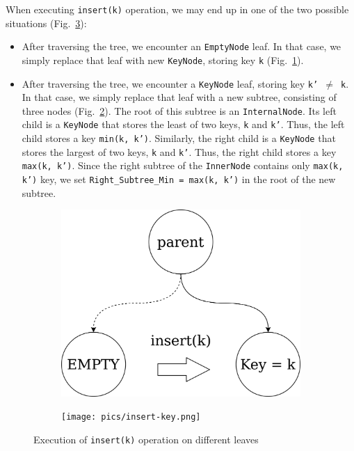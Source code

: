 \documentclass[times, dvipsnames,%
               languages={russian,english} %
              ]{itmo-student-thesis}
\begin{document}
When executing \texttt{insert(k)} operation, we may end up in one of the two possible situations (Fig.~\ref{insert-pic}):

\begin{itemize}
    \item After traversing the tree, we encounter an \texttt{EmptyNode} leaf. In that case, we simply replace that leaf with new \texttt{KeyNode}, storing key \texttt{k} (Fig.~\ref{insert-empty-pic}).
    
    \item After traversing the tree, we encounter a \texttt{KeyNode} leaf, storing key \texttt{k' $\neq$ k}. In that case, we simply replace that leaf with a new subtree, consisting of three nodes (Fig.~\ref{insert-key-pic}). The root of this subtree is an \texttt{InternalNode}. Its left child is a \texttt{KeyNode} that stores the least of two keys, \texttt{k} and \texttt{k'}. Thus, the left child stores a key \texttt{min(k, k')}. Similarly, the right child is a \texttt{KeyNode} that stores the largest of two keys, \texttt{k} and \texttt{k'}. Thus, the right child stores a key \texttt{max(k, k')}. Since the right subtree of the \texttt{InnerNode} contains only \texttt{max(k, k')} key, we set \texttt{Right\_Subtree\_Min = max(k, k')} in the root of the new subtree.
\end{itemize}

\begin{figure}[H]
     \centering
     \begin{subfigure}[b]{0.35\linewidth}
          \centering
          \includegraphics[width=\linewidth]{pics/insert-empty.png}
          \label{insert-empty-pic}
     \end{subfigure}
     \hfill
     \begin{subfigure}[b]{0.55\linewidth}
          \centering
          \texttt{[image: pics/insert-key.png]}
          \label{insert-key-pic}
    \end{subfigure}
    \caption{Execution of \texttt{insert(k)} operation on different leaves}
    \label{insert-pic}
\end{figure}
\end{document}
